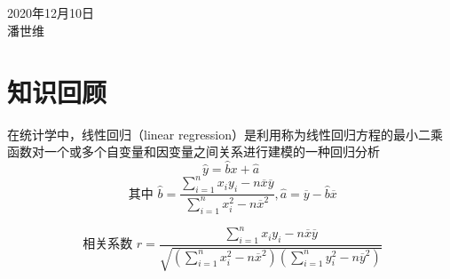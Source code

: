 \documentclass[UTF8]{article}
\begin{document}
   
\begin{center}
{}
\\ \hspace*{\fill} \\ 2020年12月10日 
\\潘世维\\
\end{center}
\section{知识回顾}  
在统计学中，线性回归（linear regression）是利用称为线性回归方程的最小二乘函数对一个或多个自变量和因变量之间关系进行建模的一种回归分析\\
$$\hat { y } = \hat { b } x + \hat { a }$$ 
$$\text { 其中 }\hat { b } = \frac { \sum\limits _ { i = 1 } ^ { n } x _ { i } y _ { i } - n \overline { x } \overline { y } } { \sum \limits_ { i = 1 } ^ { n } x _ { i } ^ { 2 } - n \overline { x } ^ { 2 } } , \hat { a } = \overline { y } - \hat { b } \overline { x }$$

$$\text { 相关系数 }r = \frac { \sum \limits_ { i = 1 } ^ { n } x _ { i } y _ { i } - n \overline { x } \overline { y } } { \sqrt { ( \sum \limits_ { i = 1 } ^ { n } x _ { i } ^ { 2 } - n \overline { x } ^ { 2 } ) ( \sum \limits_ { i = 1 } ^ { n } y _ { i } ^ { 2 } - n \overline { y } ^ { 2 } ) } } $$
\\
\end{document}
